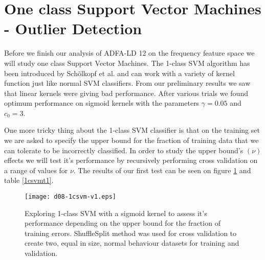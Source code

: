 \documentclass[reqno,openany,12pt]{amsbook}
\begin{document}



\section{One class Support Vector Machines - Outlier Detection}

Before we finish our analysis of ADFA-LD 12 on the frequency feature space we will study one class Support Vector Machines. The 1-class SVM algorithm has been introduced by Schölkopf et al.\cite{out4} and can work with a variety of kernel function just like normal SVM classifiers. From our preliminary results we saw that linear kernels were giving bad performance. After various trials we found optimum performance on sigmoid kernels with the parameters $\gamma = 0.05$ and $c_0 = 3$. 

One more tricky thing about the 1-class SVM classifier is that on the training set we are asked to specify the upper bound for the fraction of training data that we can tolerate to be incorrectly classified. In order to study the upper bound's $(\nu)$ effects we will test it's performance by recursively performing cross validation on a range of values for $\nu$. The results of our first test can be seen on figure \ref{1csvm-fr1} and table \ref{1csvmt1}.


\begin{figure}[th]
\texttt{[image: d08-1csvm-v1.eps]}
\caption[1-class SVM performance depending on bound for training errors]{Exploring 1-class SVM with a sigmoid kernel to assess it's performance depending on the upper bound for the fraction of training errors. ShuffleSplit method was used for cross validation to create two, equal in size, normal behaviour datasets for training and validation.}
\label{1csvm-fr1}
\end{figure}
\end{document}
